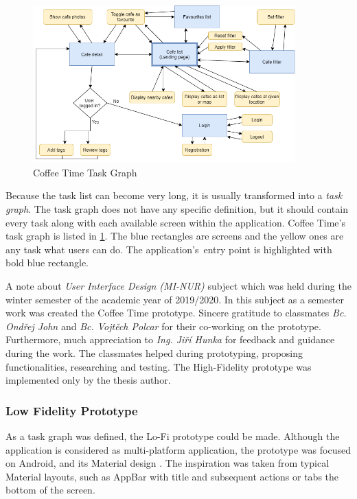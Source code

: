 \begin{figure}[htp]
    \centering
    \includegraphics[width=0.9\textwidth]{img/analysis/task-list-graph.png}
    \caption{Coffee Time Task Graph}
    \label{fig:task-graph}
\end{figure}

Because the task list can become very long, it is usually transformed into a \textit{task graph}. The task graph does not have any specific definition, but it should contain every task along with each available screen within the application. Coffee Time's task graph is listed in \cref{fig:task-graph}. The blue rectangles are screens and the yellow ones are any task what users can do. The application's~entry point is highlighted with bold blue rectangle.

A note about \textit{User Interface Design (MI-NUR)} subject which was held during the winter semester of the academic year of 2019/2020. In this subject as a semester work was created the Coffee Time prototype. Sincere gratitude to classmates \textit{Bc. Ondřej John} and \textit{Bc. Vojtěch Polcar} for their co-working on the prototype. Furthermore, much appreciation to \textit{Ing. Jiří Hunka} for feedback and guidance during the work. The classmates helped during prototyping, proposing functionalities, researching and testing. The High-Fidelity prototype was implemented only by the thesis author. 

\subsubsection{Low Fidelity Prototype}
As a task graph was defined, the Lo-Fi prototype could be made. Although the application is considered as multi-platform application, the prototype was focused on Android, and its Material design \cite{material-design}. The inspiration was taken from typical Material layouts, such as AppBar with title and subsequent actions or tabs the bottom of the screen. 

